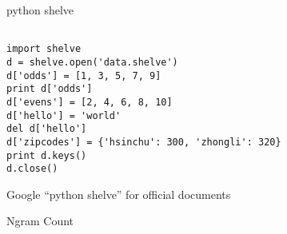 \documentclass[12pt,c]{beamer}
\begin{document}
\begin{frame}[containsverbatim]{python shelve}
\begin{verbatim}

import shelve
d = shelve.open('data.shelve')
d['odds'] = [1, 3, 5, 7, 9]
print d['odds']
d['evens'] = [2, 4, 6, 8, 10]
d['hello'] = 'world'
del d['hello']
d['zipcodes'] = {'hsinchu': 300, 'zhongli': 320}
print d.keys()
d.close()

\end{verbatim}
Google ``python shelve'' for official documents
\end{frame}  


\begin{frame}[allowframebreaks,t]{Ngram Count}
\inputminted[mathescape,
               linenos,
               numbersep=5pt,
               fontsize=\scriptsize,
               frame=lines,
               framesep=2mm]{python}{ngramcount.py}

\end{frame}
\end{document}
